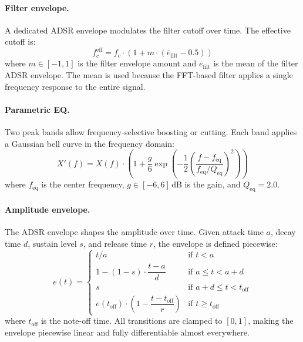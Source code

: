 \paragraph{Filter envelope.} A dedicated ADSR envelope modulates the filter cutoff over time. The effective cutoff is:
\begin{equation}
    f_c^{\text{eff}} = f_c \cdot \left(1 + m \cdot (\bar{e}_{\text{filt}} - 0.5)\right)
\end{equation}
where $m \in [-1, 1]$ is the filter envelope amount and $\bar{e}_{\text{filt}}$ is the mean of the filter ADSR envelope. The mean is used because the FFT-based filter applies a single frequency response to the entire signal.

\paragraph{Parametric EQ.} Two peak bands allow frequency-selective boosting or cutting. Each band applies a Gaussian bell curve in the frequency domain:
\begin{equation}
    X'(f) = X(f) \cdot \left(1 + \frac{g}{6} \exp\!\left(-\frac{1}{2}\left(\frac{f - f_{\text{eq}}}{f_{\text{eq}} / Q_{\text{eq}}}\right)^{\!2}\right)\right)
\end{equation}
where $f_{\text{eq}}$ is the center frequency, $g \in [-6, 6]$\,dB is the gain, and $Q_{\text{eq}} = 2.0$.

\paragraph{Amplitude envelope.} The ADSR envelope shapes the amplitude over time. Given attack time $a$, decay time $d$, sustain level $s$, and release time $r$, the envelope is defined piecewise:
\begin{equation}
    e(t) = \begin{cases}
        t / a & \text{if } t < a \\[4pt]
        1 - (1 - s) \cdot \dfrac{t - a}{d} & \text{if } a \le t < a + d \\[6pt]
        s & \text{if } a + d \le t < t_{\text{off}} \\[4pt]
        e(t_{\text{off}}) \cdot \left(1 - \dfrac{t - t_{\text{off}}}{r}\right) & \text{if } t \ge t_{\text{off}}
    \end{cases}
    \label{eq:adsr}
\end{equation}
where $t_{\text{off}}$ is the note-off time. All transitions are clamped to $[0, 1]$, making the envelope piecewise linear and fully differentiable almost everywhere.

